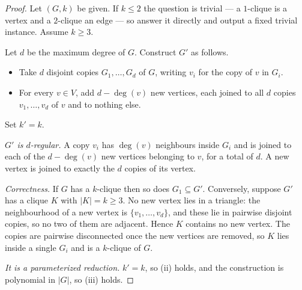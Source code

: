 \begin{proof}
Let $(G,k)$ be given. If $k \le 2$ the question is trivial --- a $1$-clique is a
vertex and a $2$-clique an edge --- so answer it directly and output a fixed
trivial instance. Assume $k \ge 3$.

Let $d$ be the maximum degree of $G$. Construct $G'$ as follows.
\begin{itemize}[leftmargin=*,nosep]
  \item Take $d$ disjoint copies $G_1, \ldots, G_d$ of $G$, writing $v_i$ for
        the copy of $v$ in $G_i$.
  \item For every $v \in V$, add $d - \deg(v)$ new vertices, each joined to all
        $d$ copies $v_1, \ldots, v_d$ of $v$ and to nothing else.
\end{itemize}
Set $k' = k$.

\emph{$G'$ is $d$-regular.} A copy $v_i$ has $\deg(v)$ neighbours inside $G_i$
and is joined to each of the $d - \deg(v)$ new vertices belonging to $v$, for a
total of $d$. A new vertex is joined to exactly the $d$ copies of its vertex.

\emph{Correctness.} If $G$ has a $k$-clique then so does $G_1 \subseteq G'$.
Conversely, suppose $G'$ has a clique $K$ with $|K| = k \ge 3$. No new vertex
lies in a triangle: the neighbourhood of a new vertex is $\{v_1,\ldots,v_d\}$,
and these lie in pairwise disjoint copies, so no two of them are adjacent.
Hence $K$ contains no new vertex. The copies are pairwise disconnected once the
new vertices are removed, so $K$ lies inside a single $G_i$ and is a $k$-clique
of $G$.

\emph{It is a parameterized reduction.} $k' = k$, so (ii) holds, and the
construction is polynomial in $|G|$, so (iii) holds.
\end{proof}

